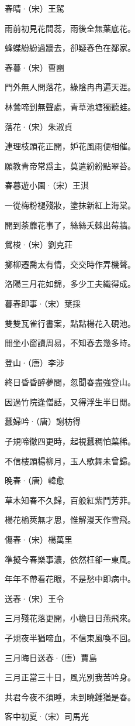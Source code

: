 \documentclass[12pt,a4paper]{ctexbook}
\begin{document}
春晴·（宋）王駕\par
雨前初見花間蕊，雨後全無葉底花。\par
蜂蝶紛紛過牆去，卻疑春色在鄰家。\par
春暮·（宋）曹豳\par
門外無人問落花，綠陰冉冉遍天涯。\par
林鶯啼到無聲處，青草池塘獨聽蛙。\par
落花·（宋）朱淑貞\par
連理枝頭花正開，妒花風雨便相催。\par
願教青帝常爲主，莫遣紛紛點翠苔。\par
春暮遊小園·（宋）王淇\par
一從梅粉褪殘妝，塗抹新紅上海棠。\par
開到荼蘼花事了，絲絲夭棘出莓牆。\par
鶯梭·（宋）劉克莊\par
擲柳遷喬太有情，交交時作弄機聲。\par
洛陽三月花如錦，多少工夫織得成。\par
暮春即事·（宋）葉採\par
雙雙瓦雀行書案，點點楊花入硯池。\par
閒坐小窗讀周易，不知春去幾多時。\par
登山·（唐）李涉\par
終日昏昏醉夢間，忽聞春盡強登山。\par
因過竹院逢僧話，又得浮生半日閒。\par
蠶婦吟·（唐）謝枋得\par
子規啼徹四更時，起視蠶稠怕葉稀。\par
不信樓頭楊柳月，玉人歌舞未曾歸。\par
晚春·（唐）韓愈\par
草木知春不久歸，百般紅紫鬥芳菲。\par
楊花榆莢無才思，惟解漫天作雪飛。\par
傷春·（宋）楊萬里\par
準擬今春樂事濃，依然枉卻一東風。\par
年年不帶看花眼，不是愁中即病中。\par
送春·（宋）王令\par
三月殘花落更開，小檐日日燕飛來。\par
子規夜半猶啼血，不信東風喚不回。\par
三月晦日送春·（唐）賈島\par
三月正當三十日，風光別我苦吟身。\par
共君今夜不須睡，未到曉鍾猶是春。\par
客中初夏·（宋）司馬光\par
\end{document}
